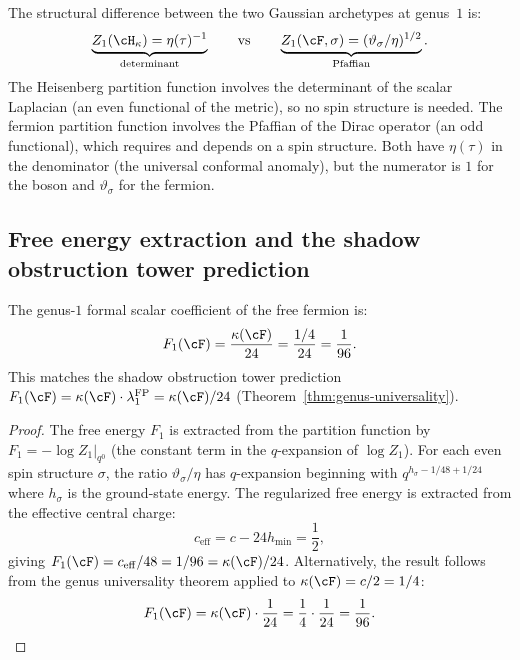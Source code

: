 \begin{remark}
\label{rem:fermion-heisenberg-genus1-comparison}
The structural difference between the two Gaussian archetypes
at genus~$1$ is:
\[
\underbrace{Z_1(\cH_\kappa)
= \eta(\tau)^{-1}}_{\text{determinant}}
\qquad\text{vs}\qquad
\underbrace{Z_1(\cF, \sigma)
= (\vartheta_\sigma / \eta)^{1/2}}_{\text{Pfaffian}}.
\]
The Heisenberg partition function involves the determinant of
the scalar Laplacian (an even functional of the metric), so
no spin structure is needed. The fermion partition function
involves the Pfaffian of the Dirac operator (an odd
functional), which requires and depends on a spin structure.
Both have $\eta(\tau)$ in the denominator (the universal
conformal anomaly), but the numerator is $1$ for the boson
and $\vartheta_\sigma$ for the fermion.
\end{remark}

\subsection{Free energy extraction and the shadow obstruction tower
prediction}
\label{subsec:fermion-free-energy}

\begin{theorem}
\label{thm:fermion-F1-shadow}
The genus-$1$ formal scalar coefficient of the free fermion is:
\begin{equation}\label{eq:fermion-F1-shadow-verification}
F_1(\cF) = \frac{\kappa(\cF)}{24}
= \frac{1/4}{24} = \frac{1}{96}.
\end{equation}
This matches the shadow obstruction tower prediction
$F_1(\cF) = \kappa(\cF) \cdot \lambda_1^{\mathrm{FP}}
= \kappa(\cF)/24$
\textup{(}Theorem~\textup{\ref{thm:genus-universality})}.
\end{theorem}

\begin{proof}
The free energy $F_1$ is extracted from the partition function
by $F_1 = -\log Z_1|_{q^0}$ (the constant term in the
$q$-expansion of $\log Z_1$). For each even spin structure
$\sigma$, the ratio $\vartheta_\sigma/\eta$ has
$q$-expansion beginning with $q^{h_\sigma - 1/48 + 1/24}$
where $h_\sigma$ is the ground-state energy. The regularized
free energy is extracted from the effective central charge:
\[
c_{\mathrm{eff}} = c - 24 h_{\min} = \frac{1}{2},
\]
giving
$F_1(\cF)=c_{\mathrm{eff}}/48=1/96=\kappa(\cF)/24$.
Alternatively, the result follows from the genus universality
theorem applied to $\kappa(\cF) = c/2 = 1/4$:
\[
F_1(\cF) = \kappa(\cF) \cdot \frac{1}{24}
= \frac{1}{4} \cdot \frac{1}{24} = \frac{1}{96}. \qedhere
\]
\end{proof}

